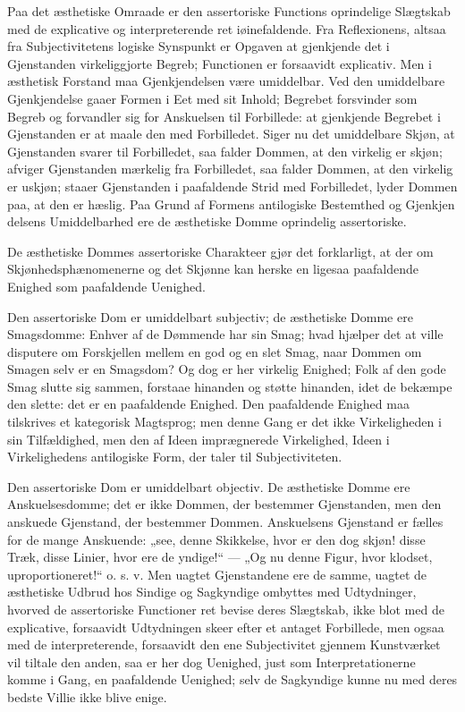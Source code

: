 \documentclass[12pt]{book}
\newcommand{\opage}[1]{\marginnote{\footnotesize\textit{[#1]}}}
\begin{document}
Paa det æsthetiske Omraade er den assertoriske Functions
oprindelige Slægtskab med de explicative og interpreterende
ret iøinefaldende. Fra Reflexionens, altsaa fra Subjectivitetens
logiske Synspunkt er Opgaven at gjenkjende det i
Gjenstanden virkeliggjorte Begreb; Functionen er forsaavidt
explicativ. Men i æsthetisk Forstand maa Gjenkjendelsen være
umiddelbar. Ved den umiddelbare Gjenkjendelse gaaer Formen
i Eet med sit Inhold; Begrebet forsvinder som Begreb og %
forvandler sig for Anskuelsen til Forbillede: at gjenkjende Begrebet
i Gjenstanden er at maale den med Forbilledet. Siger
nu det umiddelbare Skjøn, at Gjenstanden svarer til Forbilledet,
saa falder Dommen, at den virkelig er skjøn; afviger
Gjenstanden mærkelig fra Forbilledet, saa falder Dommen,
at den virkelig er uskjøn; staaer Gjenstanden i paafaldende
Strid med Forbilledet, lyder Dommen paa, at den er hæslig.
Paa Grund af Formens antilogiske Bestemthed og Gjenkjen%
\opage{204}delsens Umiddelbarhed ere de æsthetiske Domme oprindelig
assertoriske.

De æsthetiske Dommes assertoriske Charakteer gjør det
forklarligt, at der om Skjønhedsphænomenerne og det Skjønne
kan herske en ligesaa paafaldende Enighed som paafaldende
Uenighed.

Den assertoriske Dom er umiddelbart subjectiv; de æsthetiske
Domme ere Smagsdomme: Enhver af de Dømmende
har sin Smag; hvad hjælper det at ville disputere om Forskjellen
mellem en god og en slet Smag, naar Dommen om
Smagen selv er en Smagsdom? Og dog er her virkelig Enighed;
Folk af den gode Smag slutte sig sammen, forstaae
hinanden og støtte hinanden, idet de bekæmpe den slette: det
er en paafaldende Enighed. Den paafaldende Enighed maa
tilskrives et kategorisk Magtsprog; men denne Gang er det
ikke Virkeligheden i sin Tilfældighed, men den af Ideen imprægnerede
Virkelighed, Ideen i Virkelighedens antilogiske
Form, der taler til Subjectiviteten.

Den assertoriske Dom er umiddelbart objectiv. De æsthetiske
Domme ere Anskuelsesdomme; det er ikke Dommen, der
bestemmer Gjenstanden, men den anskuede Gjenstand, der bestemmer
Dommen. Anskuelsens Gjenstand er fælles for de
mange Anskuende: „see, denne Skikkelse, hvor er den dog skjøn!
disse Træk, disse Linier, hvor ere de yndige!“ --- „Og nu
denne Figur, hvor klodset, uproportioneret!“ o. s. v. Men
uagtet Gjenstandene ere de samme, uagtet de æsthetiske Udbrud
hos Sindige og Sagkyndige ombyttes med Udtydninger, hvorved
de assertoriske Functioner ret bevise deres Slægtskab, ikke
blot med de explicative, forsaavidt Udtydningen skeer efter et
antaget Forbillede, men ogsaa med de interpreterende, forsaavidt
den ene Subjectivitet gjennem Kunstværket vil tiltale den
anden, saa er her dog Uenighed, just som Interpretationerne
komme i Gang, en paafaldende Uenighed; selv de Sagkyndige
kunne nu med deres bedste Villie ikke blive enige.
\end{document}
